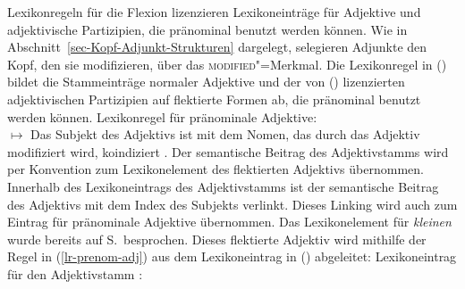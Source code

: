 {Lexikonregeln für die Flexion lizenzieren Lexikoneinträge für Adjektive und adjektivische
Partizipien, die pränominal benutzt werden können. Wie in Abschnitt~\ref{sec-Kopf-Adjunkt-Strukturen}
dargelegt, selegieren Adjunkte den Kopf, den sie modifizieren, über das
\textsc{modified}"=Merkmal. Die Lexikonregel in () bildet die Stammeinträge
normaler Adjektive und der von () lizenzierten adjektivischen Partizipien
auf flektierte Formen ab, die pränominal benutzt werden können.
%
\eas
\label{lr-prenom-adj}%
Lexikonregel für pränominale Adjektive:\\
 $\mapsto$
\zs
%
Das Subjekt des Adjektivs ist mit dem Nomen, das durch das Adjektiv modifiziert wird, koindiziert .
Der semantische Beitrag des Adjektivstamms wird per Konvention zum Lexikonelement des flektierten Adjektivs
übernommen. Innerhalb des Lexikoneintrags des Adjektivstamms ist der semantische Beitrag des
Adjektivs mit dem Index des Subjekts verlinkt. Dieses Linking wird auch zum Eintrag für pränominale Adjektive übernommen. Das
Lexikonelement für \emph{kleinen} wurde bereits auf S.\,\pageref{le-kleinen-sem} besprochen. Dieses
flektierte Adjektiv wird mithilfe der Regel in (\ref{lr-prenom-adj}) aus dem Lexikoneintrag in
() abgeleitet:
\eas
\label{le-klein-stem}%
Lexikoneintrag für den Adjektivstamm :\\%
}
